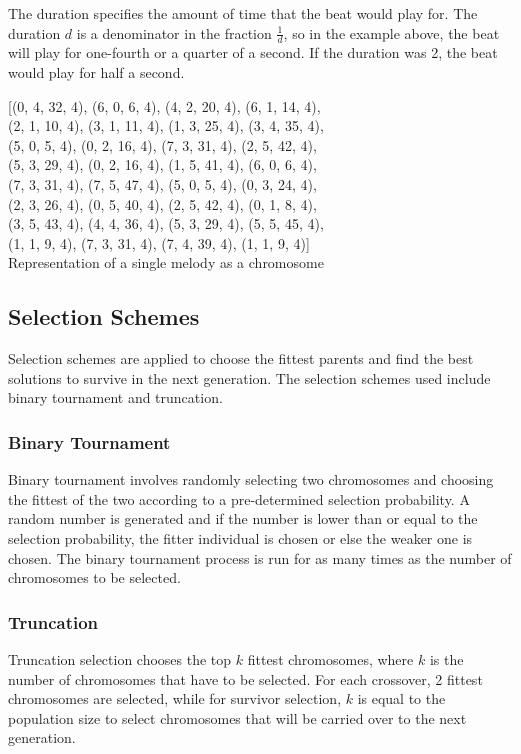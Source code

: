 \documentclass[conference]{IEEEtran}
\begin{document}
The duration specifies the amount of time that the beat would play for. The duration $d$ is a denominator in the fraction $\frac{1}{d}$, so in the example above, the beat will play for one-fourth or a quarter of a second. If the duration was 2, the beat would play for half a second.

\begin{center}
    [(0, 4, 32, 4), (6, 0, 6, 4), (4, 2, 20, 4), (6, 1, 14, 4),\\ (2, 1, 10, 4), (3, 1, 11, 4), (1, 3, 25, 4), (3, 4, 35, 4),\\ (5, 0, 5, 4), (0, 2, 16, 4), (7, 3, 31, 4), (2, 5, 42, 4),\\ (5, 3, 29, 4), (0, 2, 16, 4), (1, 5, 41, 4), (6, 0, 6, 4),\\ (7, 3, 31, 4), (7, 5, 47, 4), (5, 0, 5, 4), (0, 3, 24, 4),\\ (2, 3, 26, 4), (0, 5, 40, 4), (2, 5, 42, 4), (0, 1, 8, 4),\\ (3, 5, 43, 4), (4, 4, 36, 4), (5, 3, 29, 4), (5, 5, 45, 4),\\ (1, 1, 9, 4), (7, 3, 31, 4), (7, 4, 39, 4), (1, 1, 9, 4)]\\
    
    Representation of a single melody as a chromosome
\end{center}

\subsection{Selection Schemes}
Selection schemes are applied to choose the fittest parents and find the best solutions to survive in the next generation. The selection schemes used include binary tournament and truncation.

\subsubsection{Binary Tournament}
Binary tournament involves randomly selecting two chromosomes and choosing the fittest of the two according to a pre-determined selection probability. A random number is generated and if the number is lower than or equal to the selection probability, the fitter individual is chosen or else the weaker one is chosen. The binary tournament process is run for as many times as the number of chromosomes to be selected.

\subsubsection{Truncation}
Truncation selection chooses the top $k$ fittest chromosomes, where $k$ is the number of chromosomes that have to be selected. For each crossover, 2 fittest chromosomes are selected, while for survivor selection, $k$ is equal to the population size to select chromosomes that will be carried over to the next generation.
\end{document}
